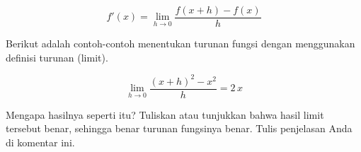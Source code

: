 \documentclass[a4paper,10pt]{article}
\begin{document}
\begin{eulernotebook}
\begin{eulercomment}
\begin{eulercomment}
\begin{eulercomment}
\end{eulercomment}
\begin{eulerformula}
\[
f'(x) = \lim_{h\to 0} \frac{f(x+h)-f(x)}{h}
\]
\end{eulerformula}
\begin{eulercomment}
Berikut adalah contoh-contoh menentukan turunan fungsi dengan
menggunakan definisi turunan (limit).
\end{eulercomment}
\begin{eulerformula}
\[
\lim_{h\rightarrow 0}{\frac{\left(x+h\right)^2-x^2}{h}}=2\,x
\]
\end{eulerformula}
\begin{eulercomment}
Mengapa hasilnya seperti itu? Tuliskan atau tunjukkan bahwa hasil
limit tersebut benar, sehingga benar turunan fungsinya benar.  Tulis
penjelasan Anda di komentar ini.


\end{eulercomment}
\end{eulercomment}
\end{eulercomment}
\end{eulernotebook}
\end{document}
